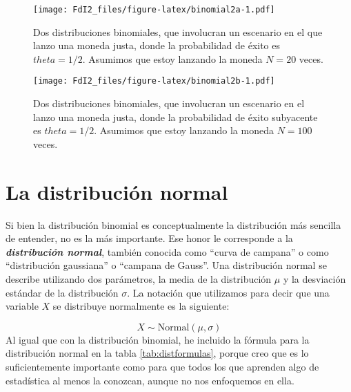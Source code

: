 \documentclass[spanish,]{book}
\begin{document}
\begin{figure}
\centering
\texttt{[image: FdI2\_files/figure-latex/binomial2a-1.pdf]}
\caption{\label{fig:binomial2a}Dos distribuciones binomiales, que involucran
un escenario en el que lanzo una moneda justa, donde la probabilidad de
éxito es \(theta = 1/2\). Asumimos que estoy lanzando la moneda \(N=20\)
veces.}
\end{figure}

\begin{figure}
\centering
\texttt{[image: FdI2\_files/figure-latex/binomial2b-1.pdf]}
\caption{\label{fig:binomial2b}Dos distribuciones binomiales, que involucran
un escenario en el lanzo una moneda justa, donde la probabilidad de
éxito subyacente es \(theta = 1/2\). Asumimos que estoy lanzando la
moneda \(N=100\) veces.}
\end{figure}

\section{La distribución normal}\label{normal}

Si bien la distribución binomial es conceptualmente la distribución más
sencilla de entender, no es la más importante. Ese honor le corresponde
a la \textbf{\emph{distribución normal}}, también conocida como ``curva
de campana'' o como ``distribución gaussiana'' o ``campana de Gauss''.
Una distribución normal se describe utilizando dos parámetros, la media
de la distribución \(\mu\) y la desviación estándar de la distribución
\(\sigma\). La notación que utilizamos para decir que una variable \(X\)
se distribuye normalmente es la siguiente:

\[
  X \sim \mbox{Normal}(\mu,\sigma)
\] Al igual que con la distribución binomial, he incluido la fórmula
para la distribución normal en la tabla \ref{tab:distformulas}, porque
creo que es lo suficientemente importante como para que todos los que
aprenden algo de estadística al menos la conozcan, aunque no nos
enfoquemos en ella.
\end{document}
